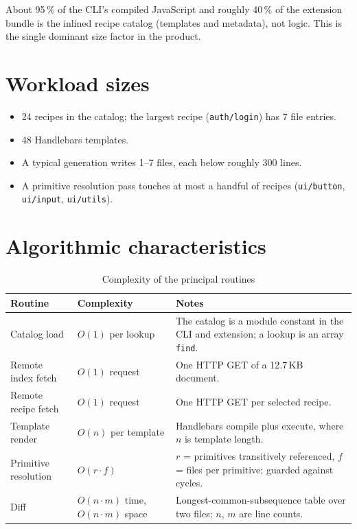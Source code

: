 About 95\,\% of the CLI's compiled JavaScript and roughly 40\,\% of the
extension bundle is the inlined recipe catalog (templates and metadata), not
logic. This is the single dominant size factor in the product.

\section{Workload sizes}

\begin{itemize}
  \item 24 recipes in the catalog; the largest recipe (\texttt{auth/login}) has
        7 file entries.
  \item 48 Handlebars templates.
  \item A typical generation writes 1--7 files, each below roughly 300 lines.
  \item A primitive resolution pass touches at most a handful of recipes
        (\texttt{ui/button}, \texttt{ui/input}, \texttt{ui/utils}).
\end{itemize}

\section{Algorithmic characteristics}

\begin{longtable}{p{4.2cm}p{3.4cm}p{6.2cm}}
\caption{Complexity of the principal routines}\\
\toprule
\textbf{Routine} & \textbf{Complexity} & \textbf{Notes} \\
\midrule

Catalog load & $O(1)$ per lookup & The catalog is a module constant in the CLI and
extension; a lookup is an array \texttt{find}. \\
Remote index fetch & $O(1)$ request & One HTTP GET of a 12.7\,KB document. \\
Remote recipe fetch & $O(1)$ request & One HTTP GET per selected recipe. \\
Template render & $O(n)$ per template & Handlebars compile plus execute, where $n$ is
template length. \\
Primitive resolution & $O(r \cdot f)$ & $r$ = primitives transitively referenced, $f$
= files per primitive; guarded against cycles. \\
Diff & $O(n \cdot m)$ time, $O(n \cdot m)$ space & Longest-common-subsequence
table over two files; $n$, $m$ are line counts. \\
\bottomrule
\end{longtable}

